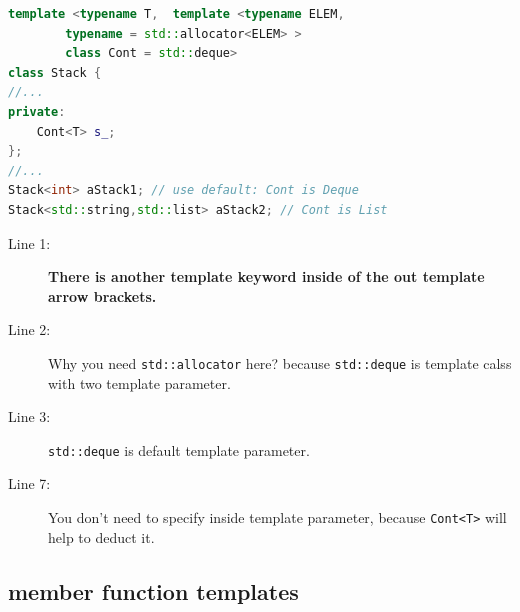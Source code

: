 \documentclass[a4paper,11pt,twoside]{book}
\begin{document}
\begin{itemize}
\begin{lstlisting}[frame=single, language=c++]
template <typename T,  template <typename ELEM, 
		typename = std::allocator<ELEM> > 
		class Cont = std::deque>
class Stack {
//...
private:
	Cont<T> s_;
};
//...
Stack<int> aStack1; // use default: Cont is Deque
Stack<std::string,std::list> aStack2; // Cont is List
\end{lstlisting}
\begin{description}
	\item[Line 1:] \textbf{There is another template keyword inside of the out template arrow brackets.} 
	
	\item[Line 2:] Why you need \texttt{std::allocator} here? because \texttt{std::deque} is template calss with two template parameter.
	
	\item[Line 3:] \texttt{std::deque} is default template parameter.
	
	\item[Line 7:] You don't need to specify inside template parameter, because \texttt{Cont<T>} will help to deduct it.
	
\end{description}

\end{itemize}



\subsection{member function templates}
\end{document}
